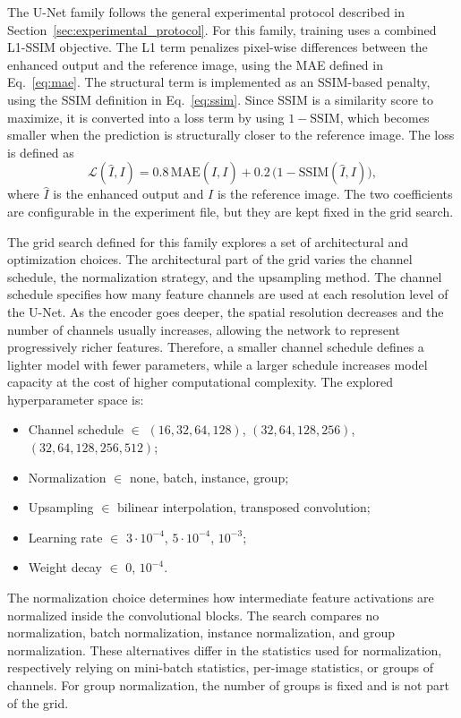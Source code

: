The U-Net family follows the general experimental protocol described in Section~\ref{sec:experimental_protocol}. For this family, training uses a combined L1-SSIM objective. The L1 term penalizes pixel-wise differences between the enhanced output and the reference image, using the MAE defined in Eq.~\ref{eq:mae}. The structural term is implemented as an SSIM-based penalty, using the SSIM definition in Eq.~\ref{eq:ssim}. Since SSIM is a similarity score to maximize, it is converted into a loss term by using $1 - \mathrm{SSIM}$, which becomes smaller when the prediction is structurally closer to the reference image. The loss is defined as
\begin{equation}
	\mathcal{L}(\hat{I}, I)
	=
	0.8 \, \mathrm{MAE}(\hat{I}, I)
	+
	0.2 \, \bigl(1 - \mathrm{SSIM}(\hat{I}, I)\bigr),
	\label{eq:l1_ssim_loss}
\end{equation}
where $\hat{I}$ is the enhanced output and $I$ is the reference image. The two coefficients are configurable in the experiment file, but they are kept fixed in the grid search.

The grid search defined for this family explores a set of architectural and optimization choices. The architectural part of the grid varies the channel schedule, the normalization strategy, and the upsampling method. The channel schedule specifies how many feature channels are used at each resolution level of the U-Net. As the encoder goes deeper, the spatial resolution decreases and the number of channels usually increases, allowing the network to represent progressively richer features. Therefore, a smaller channel schedule defines a lighter model with fewer parameters, while a larger schedule increases model capacity at the cost of higher computational complexity. The explored hyperparameter space is:

\begin{itemize}[topsep=5pt]
	\item Channel schedule $\in$ $(16,32,64,128)$, $(32,64,128,256)$, $(32,64,128,256,512)$;
	\item Normalization $\in$ none, batch, instance, group;
	\item Upsampling $\in$ bilinear interpolation, transposed convolution;
	\item Learning rate $\in$ $3{\cdot}10^{-4}$, $5{\cdot}10^{-4}$, $10^{-3}$;
	\item Weight decay $\in$ $0$, $10^{-4}$.
\end{itemize}

The normalization choice determines how intermediate feature activations are normalized inside the convolutional blocks. The search compares no normalization, batch normalization, instance normalization, and group normalization. These alternatives differ in the statistics used for normalization, respectively relying on mini-batch statistics, per-image statistics, or groups of channels. For group normalization, the number of groups is fixed and is not part of the grid.

